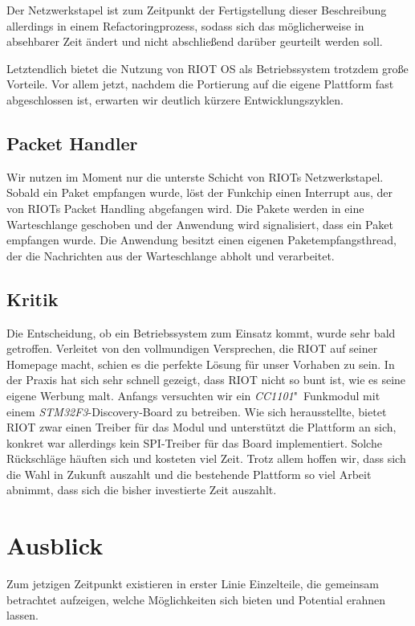 \documentclass{IEEEtran}
\begin{document}
        Der Netzwerkstapel ist zum Zeitpunkt der Fertigstellung dieser
        Beschreibung allerdings in einem Refactoringprozess,
        sodass sich das möglicherweise in absehbarer Zeit ändert und nicht
        abschließend darüber geurteilt werden soll.

        Letztendlich bietet die Nutzung von RIOT OS als Betriebssystem trotzdem
        große Vorteile. Vor allem jetzt, nachdem die Portierung auf die eigene
        Plattform fast abgeschlossen ist, erwarten wir deutlich kürzere
        Entwicklungszyklen.

    \subsection{Packet Handler}
        Wir nutzen im Moment nur die unterste Schicht von RIOTs Netzwerkstapel.
        Sobald ein Paket empfangen wurde, löst der Funkchip einen Interrupt aus,
        der von RIOTs Packet Handling abgefangen wird. Die Pakete werden in eine
        Warteschlange geschoben und der Anwendung wird signalisiert,
        dass ein Paket empfangen wurde.
        Die Anwendung besitzt einen eigenen Paketempfangsthread,
        der die Nachrichten aus der Warteschlange abholt und verarbeitet.


    \subsection{Kritik}
        Die Entscheidung, ob ein Betriebssystem zum Einsatz kommt,
        wurde sehr bald getroffen. Verleitet von den vollmundigen Versprechen,
        die RIOT auf seiner Homepage macht, schien es die perfekte Lösung für
        unser Vorhaben zu sein. In der Praxis hat sich sehr schnell gezeigt,
        dass RIOT nicht so bunt ist, wie es seine eigene Werbung malt.
        Anfangs versuchten wir ein \emph{CC1101}"~Funkmodul mit einem
        \emph{STM32F3}-Discovery-Board zu betreiben. Wie sich herausstellte,
        bietet RIOT zwar einen Treiber für das Modul und unterstützt die
        Plattform an sich, konkret war allerdings kein SPI-Treiber für das Board
        implementiert. Solche Rückschläge häuften sich und kosteten viel Zeit.
        Trotz allem hoffen wir, dass sich die Wahl in Zukunft auszahlt und
        die bestehende Plattform so viel Arbeit abnimmt, dass sich die
        bisher investierte Zeit auszahlt.


\section{Ausblick}
    Zum jetzigen Zeitpunkt existieren in erster Linie Einzelteile,
    die gemeinsam betrachtet aufzeigen, welche Möglichkeiten sich bieten
    und Potential erahnen lassen.
\end{document}
